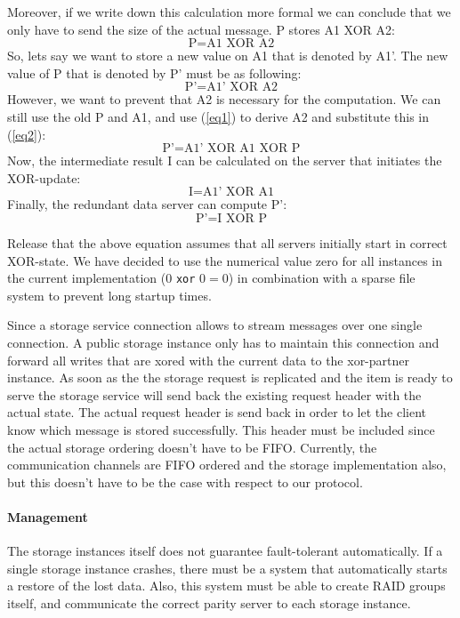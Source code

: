 \documentclass[12pt,a4paper]{scrartcl}
\begin{document}
Moreover, if we write down this calculation more formal we can conclude that we only have to send the size of the actual message. P stores A1 XOR A2:
\begin{equation}\label{eq1}
\text{P} = \text{A1} \text{ XOR } \text{A2}
\end{equation}
So, lets say we want to store a new value on A1 that is denoted by A1’. The new value of P that is denoted by P’ must be as following:
\begin{equation}\label{eq2}
\text{P’} = \text{A1’} \text{ XOR } \text{A2}
\end{equation}
However, we want to prevent that A2 is necessary for the computation. We can still use the old P and A1, and use (\ref{eq1}) to derive A2 and substitute this in (\ref{eq2}):
$$\text{P’} = \text{A1’} \text{ XOR } \text{A1} \text{ XOR } \text{P}$$
Now, the intermediate result I can be calculated on the server that initiates the XOR-update:
$$\text{I} = \text{A1’} \text{ XOR } \text{A1}$$
Finally, the redundant data server can compute P’:
$$\text{P’} = \text{I} \text{ XOR } \text{P}$$

Release that the above equation assumes that all servers initially start in correct XOR-state. We have decided to use the numerical value zero for all instances in the current implementation ($0$ \verb|xor| $0 = 0$) in combination with a sparse file system to prevent long startup times.

Since a storage service connection allows to stream messages over one single connection. A public storage instance only has to maintain this connection and forward all writes that are xored with the current data to the xor-partner instance. As soon as the the storage request is replicated and the item is ready to serve the storage service will send back the existing request header with the actual state. The actual request header is send back in order to let the client know which message is stored successfully. This header must be included since the actual storage ordering doesn't have to be FIFO. Currently, the communication channels are FIFO ordered and the storage implementation also, but this doesn't have to be the case with respect to our protocol.

\paragraph{Management}
The storage instances itself does not guarantee fault-tolerant automatically. If a single storage instance crashes, there must be a system that automatically starts a restore of the lost data. Also, this system must be able to create RAID groups itself, and communicate the correct parity server to each storage instance.
\end{document}
